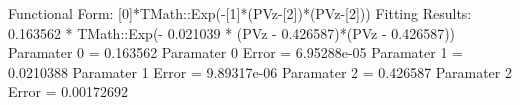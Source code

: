 Functional Form: [0]*TMath::Exp(-[1]*(PVz-[2])*(PVz-[2]))
Fitting Results: 0.163562 * TMath::Exp(- 0.021039 * (PVz - 0.426587)*(PVz - 0.426587))
Paramater 0 = 0.163562
Paramater 0 Error = 6.95288e-05
Paramater 1 = 0.0210388
Paramater 1 Error = 9.89317e-06
Paramater 2 = 0.426587
Paramater 2 Error = 0.00172692
